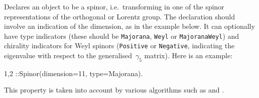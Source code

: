 
Declares an object to be a spinor, i.e.~transforming in one of the
spinor representations of the orthogonal or Lorentz group. The
declaration should involve an indication of the dimension, as in the
example below. It can optionally have type indicators (these should be
{\tt Majorana}, {\tt Weyl} or {\tt MajoranaWeyl}) and chirality
indicators for Weyl spinors ({\tt Positive} or {\tt Negative},
indicating the eigenvalue with respect to the generalised~$\gamma_5$
matrix). Here is an example:
\begin{screen}{1,2}
\psi::Spinor(dimension=11, type=Majorana).
\end{screen}
This property is taken into account by various algorithms such
as  and .


